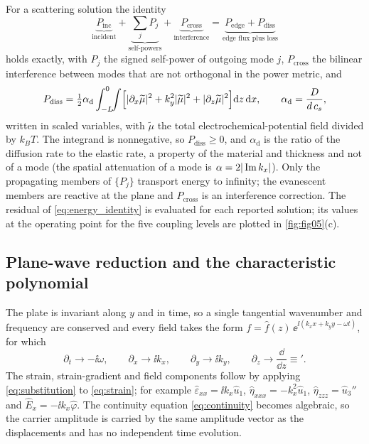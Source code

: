 For a scattering solution the identity
\begin{equation}
\label{eq:energy_identity}
\underbrace{P_{\text{inc}}}_{\text{incident}}
+\underbrace{\sum_{j}P_j}_{\text{self-powers}}
+\underbrace{P_{\text{cross}}}_{\text{interference}}
=\underbrace{P_{\text{edge}}+P_{\text{diss}}}_{\text{edge flux plus loss}}
\end{equation}
holds exactly, with $P_j$ the signed self-power of outgoing mode $j$, $P_{\text{cross}}$ the bilinear interference between modes that are not orthogonal in the power metric, and
\begin{equation*}
P_{\text{diss}}=\tfrac12\alpha_{\mathrm{d}}\int_{-L}^{0}\!\!\int
\Bigl[|\partial_x\widetilde\mu|^{2}+k_y^2|\widetilde\mu|^2+|\partial_z\widetilde\mu|^2\Bigr]\mathrm{d} z\,\mathrm{d} x ,
\qquad \alpha_{\mathrm{d}}=\frac{D}{d\,c_s},
\end{equation*}
written in scaled variables, with $\widetilde\mu$ the total electrochemical-potential field divided by $k_BT$.  The integrand is nonnegative, so $P_{\text{diss}}\ge0$, and $\alpha_{\mathrm d}$ is the ratio of the diffusion rate to the elastic rate, a property of the material and thickness and not of a mode (the spatial attenuation of a mode is $\alpha=2|\operatorname{Im} k_x|$).  Only the propagating members of $\{P_j\}$ transport energy to infinity; the evanescent members are reactive at the plane and $P_{\text{cross}}$ is an interference correction.  The residual of \eqref{eq:energy_identity} is evaluated for each reported solution; its values at the operating point for the five coupling levels are plotted in \cref{fig:fig05}(c).

\subsection{Plane-wave reduction and the characteristic polynomial}
\label{sec:governing_reduction}

The plate is invariant along $y$ and in time, so a single tangential wavenumber and
frequency are conserved and every field takes the form
$f=\widehat f(z)\,\ee^{\ii(k_xx+k_yy-\omega t)}$, for which
\begin{equation}
\label{eq:substitution}
\partial_t\to-\ii\omega,\qquad
\partial_x\to\ii k_x,\qquad
\partial_y\to\ii k_y,\qquad
\partial_z\to\frac{\dd}{\dd z}\equiv{}' .
\end{equation}
The strain, strain-gradient and field components follow by applying
\eqref{eq:substitution} to \eqref{eq:strain}; for example
$\widehat\varepsilon_{xx}=\ii k_x\widehat u_1$,
$\widehat\eta_{xxx}=-k_x^{2}\widehat u_1$, $\widehat\eta_{zzz}=\widehat u_3''$ and
$\widehat E_x=-\ii k_x\widehat\varphi$.  The continuity equation
\eqref{eq:continuity} becomes algebraic, so the carrier amplitude is carried by the
same amplitude vector as the displacements and has no independent time evolution.


